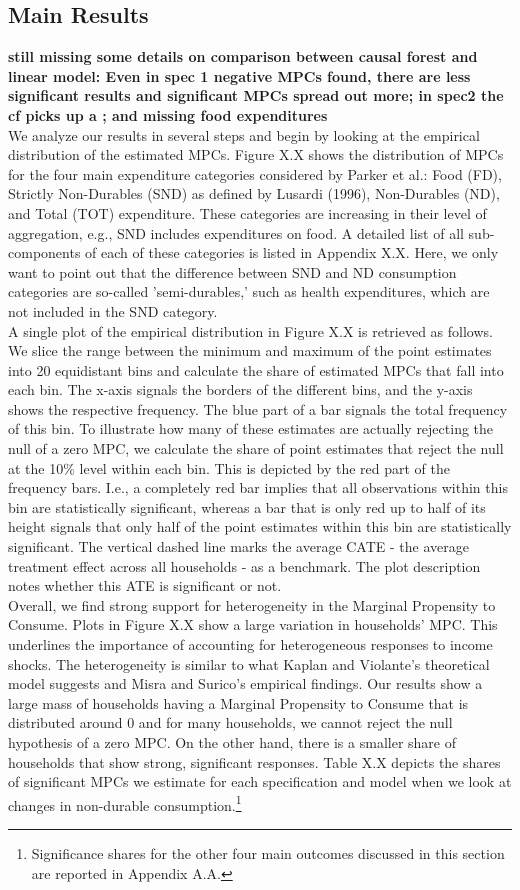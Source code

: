 \subsection{Main Results}
\textbf{still missing some details on comparison between causal forest and linear model: Even in spec 1 negative MPCs found, there are less significant results and significant MPCs spread out more; in spec2 the cf picks up a ; and missing food expenditures} \\
We analyze our results in several steps and begin by looking at the empirical distribution of the estimated MPCs. Figure X.X shows the distribution of MPCs for the four main expenditure categories considered by Parker et al.: Food (FD), Strictly Non-Durables (SND) as defined by Lusardi (1996), Non-Durables (ND), and Total (TOT) expenditure. These categories are increasing in their level of aggregation, e.g., SND includes expenditures on food. A detailed list of all sub-components of each of these categories is listed in Appendix X.X. Here, we only want to point out that the difference between SND and ND consumption categories are so-called 'semi-durables,' such as health expenditures, which are not included in the SND category. \\
A single plot of the empirical distribution in Figure X.X is retrieved as follows. We slice the range between the minimum and maximum of the point estimates into 20 equidistant bins and calculate the share of estimated MPCs that fall into each bin. The x-axis signals the borders of the different bins, and the y-axis shows the respective frequency. The blue part of a bar signals the total frequency of this bin. To illustrate how many of these estimates are actually rejecting the null of a zero MPC, we calculate the share of point estimates that reject the null at the 10\% level within each bin. This is depicted by the red part of the frequency bars. I.e., a completely red bar implies that all observations within this bin are statistically significant, whereas a bar that is only red up to half of its height signals that only half of the point estimates within this bin are statistically significant. The vertical dashed line marks the average CATE - the average treatment effect across all households - as a benchmark. The plot description notes whether this ATE is significant or not. \\ 
Overall, we find strong support for heterogeneity in the Marginal Propensity to Consume. Plots in Figure X.X show a large variation in households' MPC. This underlines the importance of accounting for heterogeneous responses to income shocks. The heterogeneity is similar to what Kaplan and Violante's theoretical model suggests and Misra and Surico's empirical findings. Our results show a large mass of households having a Marginal Propensity to Consume that is distributed around 0 and for many households, we cannot reject the null hypothesis of a zero MPC. On the other hand, there is a smaller share of households that show strong, significant responses. Table X.X depicts the shares of significant MPCs we estimate for each specification and model when we look at changes in non-durable consumption.\footnote{Significance shares for the other four main outcomes discussed in this section are reported in Appendix A.A.} \\
